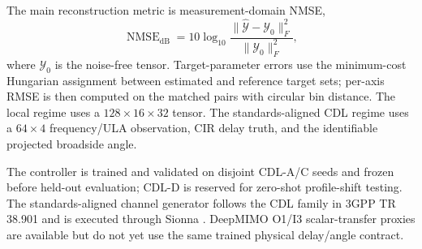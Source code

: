 The main reconstruction metric is measurement-domain NMSE,
\begin{equation}
 \operatorname{NMSE}_{\mathrm{dB}}=10\log_{10}
 \frac{\|\widehat{\mathcal{Y}}-\mathcal{Y}_0\|_F^2}{\|\mathcal{Y}_0\|_F^2},
 \label{eq:nmse_metric}
\end{equation}
where $\mathcal{Y}_0$ is the noise-free tensor. Target-parameter errors use the minimum-cost Hungarian assignment between estimated and reference target sets; per-axis RMSE is then computed on the matched pairs with circular bin distance. The local regime uses a $128\times16\times32$ tensor. The standards-aligned CDL regime uses a $64\times4$ frequency/ULA observation, CIR delay truth, and the identifiable projected broadside angle.

The controller is trained and validated on disjoint CDL-A/C seeds and frozen before held-out evaluation; CDL-D is reserved for zero-shot profile-shift testing. The standards-aligned channel generator follows the CDL family in 3GPP TR 38.901 and is executed through Sionna \cite{3gpp38901,hoydis2023sionna}. DeepMIMO O1/I3 scalar-transfer proxies are available but do not yet use the same trained physical delay/angle contract.
